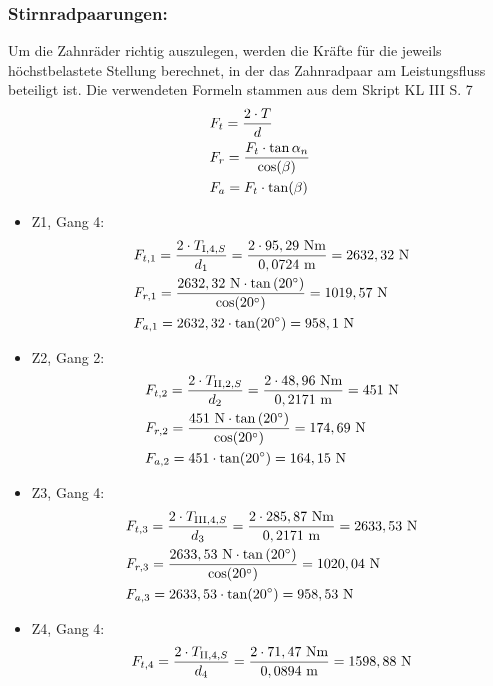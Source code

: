 \subsubsection {Stirnradpaarungen:}
Um die Zahnräder richtig auszulegen, werden die Kräfte für die jeweils höchstbelastete Stellung berechnet, in der das Zahnradpaar am Leistungsfluss beteiligt ist. 
Die verwendeten Formeln stammen aus dem Skript KL III S. 7
\begin{align*}
	&F_t = \frac{2\cdot T}{d} \\
	&F_r= \frac{F_t \cdot \tan{\alpha_n}}{\cos(\beta)} \\
	&F_a = F_t \cdot \tan(\beta) \\
\end{align*}
\begin{itemize}
\item {Z1, Gang 4:}
\begin{align*} 
	&F_{t,1} = \frac{2\cdot T_{\mathrm{I},4,S}}{d_1} = \frac{2 \cdot 95,29 \text{ Nm}}{0,0724 \text{ m}} = 2632,32 \text{ N}\\ 
	&F_{r,1} = \frac{2632,32 \text{ N} \cdot \tan{(20^\circ)}}{\cos(20^\circ)} = 1019,57\text{ N}\\ 
	&F_{a,1} =2632,32 \cdot \tan(20^\circ) = 958,1 \text{ N}
\end{align*}
\item Z2, Gang 2:
\begin{align*}
	&F_{t,2} = \frac{2\cdot T_{\mathrm{II},2,S}}{d_2} = \frac{2 \cdot 48,96 \text{ Nm}}{0,2171 \text{ m}} =451 \text{ N}\\ 
	&F_{r,2} = \frac{451 \text{ N} \cdot \tan{(20^\circ)}}{\cos(20^\circ)} = 174,69\text{ N}\\ 
	&F_{a,2} = 451 \cdot \tan(20^\circ) = 164,15 \text{ N}	
\end{align*}
\item Z3, Gang 4:
\begin{align*}
	&F_{t,3} = \frac{2\cdot T_{\mathrm{III},4,S}}{d_3} = \frac{2 \cdot 285,87 \text{ Nm}}{0,2171 \text{ m}} = 2633,53 \text{ N}\\ 
	&F_{r,3} = \frac{2633,53 \text{ N} \cdot \tan{(20^\circ)}}{\cos(20^\circ)} = 1020,04\text{ N}\\ 
	&F_{a,3} = 2633,53 \cdot \tan(20^\circ) = 958,53 \text{ N}
\end{align*}
\item Z4, Gang 4:
\begin{align*}
	&F_{t,4} = \frac{2\x T_{\mathrm{II},4,S}}{d_4} = \frac{2 \x 71,47 \text{ Nm}}{0,0894 \text{ m}} = 1598,88 \text{ N}\\ 

\end{align*}
\end{itemize}
